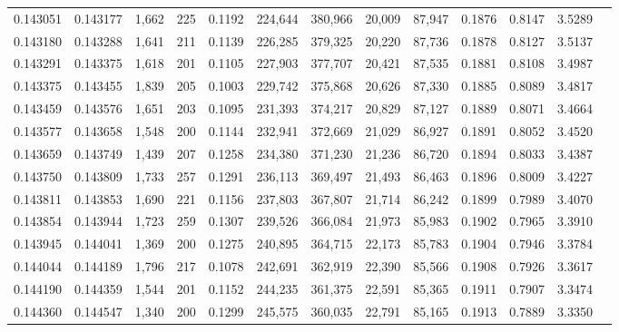 \begin{tabular}{rrrrrrrrrrrrr}
0.143051 & 0.143177 & 1,662 & 225 &                                     0.1192 & 224,644 & 380,966 &  20,009 &  87,947 & 0.1876 & 0.8147 & 3.5289 \\
0.143180 & 0.143288 & 1,641 & 211 &                                     0.1139 & 226,285 & 379,325 &  20,220 &  87,736 & 0.1878 & 0.8127 & 3.5137 \\
0.143291 & 0.143375 & 1,618 & 201 &                                     0.1105 & 227,903 & 377,707 &  20,421 &  87,535 & 0.1881 & 0.8108 & 3.4987 \\
0.143375 & 0.143455 & 1,839 & 205 &                                     0.1003 & 229,742 & 375,868 &  20,626 &  87,330 & 0.1885 & 0.8089 & 3.4817 \\
0.143459 & 0.143576 & 1,651 & 203 &                                     0.1095 & 231,393 & 374,217 &  20,829 &  87,127 & 0.1889 & 0.8071 & 3.4664 \\
0.143577 & 0.143658 & 1,548 & 200 &                                     0.1144 & 232,941 & 372,669 &  21,029 &  86,927 & 0.1891 & 0.8052 & 3.4520 \\
0.143659 & 0.143749 & 1,439 & 207 &                                     0.1258 & 234,380 & 371,230 &  21,236 &  86,720 & 0.1894 & 0.8033 & 3.4387 \\
0.143750 & 0.143809 & 1,733 & 257 &                                     0.1291 & 236,113 & 369,497 &  21,493 &  86,463 & 0.1896 & 0.8009 & 3.4227 \\
0.143811 & 0.143853 & 1,690 & 221 &                                     0.1156 & 237,803 & 367,807 &  21,714 &  86,242 & 0.1899 & 0.7989 & 3.4070 \\
0.143854 & 0.143944 & 1,723 & 259 &                                     0.1307 & 239,526 & 366,084 &  21,973 &  85,983 & 0.1902 & 0.7965 & 3.3910 \\
0.143945 & 0.144041 & 1,369 & 200 &                                     0.1275 & 240,895 & 364,715 &  22,173 &  85,783 & 0.1904 & 0.7946 & 3.3784 \\
0.144044 & 0.144189 & 1,796 & 217 &                                     0.1078 & 242,691 & 362,919 &  22,390 &  85,566 & 0.1908 & 0.7926 & 3.3617 \\
0.144190 & 0.144359 & 1,544 & 201 &                                     0.1152 & 244,235 & 361,375 &  22,591 &  85,365 & 0.1911 & 0.7907 & 3.3474 \\
0.144360 & 0.144547 & 1,340 & 200 &                                     0.1299 & 245,575 & 360,035 &  22,791 &  85,165 & 0.1913 & 0.7889 & 3.3350 \\

\end{tabular}
